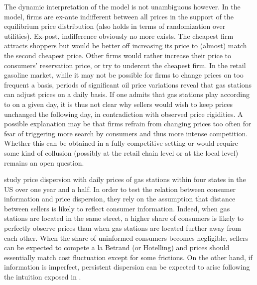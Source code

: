 \documentclass[english]{article}
\begin{document}
The dynamic interpretation of the model is not unambiguous however. In the model, firms are ex-ante indifferent between all prices in the support of the equilibrium price distribution (also holds in terms of randomization over utilities). Ex-post, indifference obviously no more exists. The cheapest firm attracts shoppers but would be better off increasing its price to (almost) match the second cheapest price. Other firms would rather increase their price to consumers' reservation price, or try to undercut the cheapest firm. In the retail gasoline market, while it may not be possible for firms to change prices on too frequent a basis, periods of significant oil price variations reveal that gas stations can adjust prices on a daily basis. If one admits that gas stations play according to \cite{VAR80} on a given day, it is thus not clear why sellers would wish to keep prices unchanged the following day, in contradiction with observed price rigidities. A possible explanation may be that firms refrain from changing prices too often for fear of triggering more search by consumers and thus more intense competition. Whether this can be obtained in a fully competitive setting  or would require some kind of collusion (possibly at the retail chain level or at the local level) remains an open question.

\cite{TAP11} study price dispersion with daily prices of gas stations within four states in the US over one year and a half. In order to test the relation between consumer information and price dispersion, they rely on the assumption that distance between sellers is likely to reflect consumer information. Indeed, when gas stations are located in the same street, a higher share of consumers is likely to perfectly observe prices than when gas stations are located further away from each other. When the share of uninformed consumers becomes negligible, sellers can be expected to compete a la Betrand (or Hotelling) and prices should essentially match cost fluctuation except for some frictions. On the other hand, if information is imperfect, persistent dispersion can be expected to arise following the intuition exposed in \cite{VAR80}.
\end{document}
